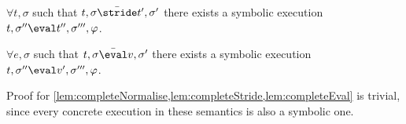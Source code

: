 \begin{lemma}
  \label{lem:completeStride}
  $\forall t,\sigma$ such that $t,\sigma \bar{\stride}t',\sigma'$
  there exists a symbolic execution $t,\sigma''\eval t'',\sigma''',\phi$.
\end{lemma}


\begin{lemma}
  \label{lem:completeEval}
  $\forall e,\sigma$ such that $t,\sigma \bar{\eval}v,\sigma'$
  there exists a symbolic execution $t,\sigma''\eval v',\sigma''',\phi$.
\end{lemma}


Proof for \cref{lem:completeNormalise,lem:completeStride,lem:completeEval} is trivial,
since every concrete execution in these semantics is also a symbolic one.
